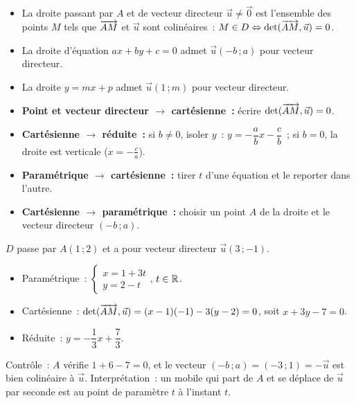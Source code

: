 \begin{prop}
\begin{itemize}
  \item La droite passant par $A$ et de vecteur directeur $\vec u\ne\vec0$ est
        l'ensemble des points $M$ tels que $\overrightarrow{AM}$ et $\vec u$ sont colin\'eaires~:
        $M\in D \Leftrightarrow \det(\overrightarrow{AM},\vec u)=0$.
  \item La droite d'\'equation $ax+by+c=0$ admet $\vec u(-b\,;a)$ pour vecteur directeur.
  \item La droite $y=mx+p$ admet $\vec u(1\,;m)$ pour vecteur directeur.
\end{itemize}
\end{prop}

\begin{methode}
\begin{itemize}
  \item \textbf{Point et vecteur directeur $\to$ cart\'esienne~:} \'ecrire $\det(\overrightarrow{AM},\vec u)=0$.
  \item \textbf{Cart\'esienne $\to$ r\'eduite~:} si $b\ne0$, isoler $y$~:
        $y=-\dfrac{a}{b}x-\dfrac{c}{b}$~; si $b=0$, la droite est verticale ($x=-\frac ca$).
  \item \textbf{Param\'etrique $\to$ cart\'esienne~:} tirer $t$ d'une \'equation et
        le reporter dans l'autre.
  \item \textbf{Cart\'esienne $\to$ param\'etrique~:} choisir un point $A$ de la droite
        et le vecteur directeur $(-b\,;a)$.
\end{itemize}
\end{methode}

\begin{ex}
$D$ passe par $A(1\,;2)$ et a pour vecteur directeur $\vec u(3\,;-1)$.
\begin{itemize}
  \item Param\'etrique~: $\begin{cases}x=1+3t\\y=2-t\end{cases}$, $t\in\mathbb{R}$.
  \item Cart\'esienne~: $\det(\overrightarrow{AM},\vec u)=(x-1)(-1)-3(y-2)=0$, soit $x+3y-7=0$.
  \item R\'eduite~: $y=-\dfrac13x+\dfrac73$.
\end{itemize}
Contr\^ole~: $A$ v\'erifie $1+6-7=0$, et le vecteur $(-b\,;a)=(-3\,;1)=-\vec u$
est bien colin\'eaire \`a $\vec u$.
Interpr\'etation~: un mobile qui part de $A$ et se d\'eplace de $\vec u$ par seconde
est au point de param\`etre $t$ \`a l'instant $t$.
\end{ex}

